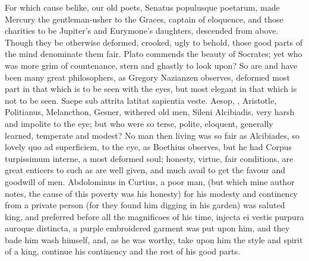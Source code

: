 {For which cause belike, our old poets, Senatus populusque poetarum,
made Mercury the gentleman-usher to the Graces, captain of eloquence,
and those charities to be Jupiter's and Eurymone's daughters, descended
from above. Though they be otherwise deformed, crooked, ugly to behold,
those good parts of the mind denominate them fair. Plato commends the
beauty of Socrates; yet who was more grim of countenance, stern and
ghastly to look upon? So are and have been many great philosophers, as
Gregory Nazianzen observes, deformed most part in that which is
to be seen with the eyes, but most elegant in that which is not to be
seen. Saepe sub attrita latitat sapientia veste. Aesop, \Democritus{},
Aristotle, Politianus, Melancthon, Gesner, \etc{} withered old men, Sileni
Alcibiadis, very harsh and impolite to the eye; but who were so terse,
polite, eloquent, generally learned, temperate and modest? No man then
living was so fair as Alcibiades, so lovely quo ad superficiem, to the
eye, as Boethius observes, but he had Corpus turpissimum interne,
a most deformed soul; honesty, virtue, fair conditions, are great
enticers to such as are well given, and much avail to get the favour
and goodwill of men. Abdolominus in Curtius, a poor man, (but which
mine author notes, the cause of this poverty was his honesty) for
his modesty and continency from a private person (for they found him
digging in his garden) was saluted king, and preferred before all the
magnificoes of his time, injecta ei vestis purpura auroque distincta, a
purple embroidered garment was put upon him, and they bade him
wash himself, and, as he was worthy, take upon him the style and spirit
of a king, continue his continency and the rest of his good parts.

}
